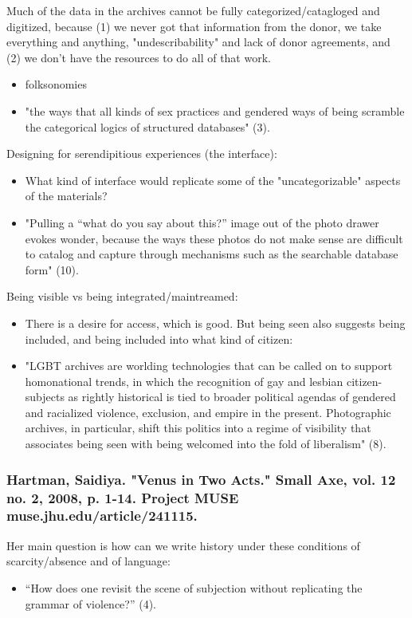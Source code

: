 \documentclass[11pt]{article}
\begin{document}
Much of the data in the archives cannot be fully
categorized/catagloged and digitized, because (1) we never got that
information from the donor, we take everything and anything,
"undescribability" and lack of donor agreements, and (2) we don't have
the resources to do all of that work.
\begin{itemize}
\item folksonomies
\item "the ways that all kinds of sex practices and gendered ways of being
scramble the categorical logics of structured databases" (3).
\end{itemize}

Designing for serendipitious experiences (the interface): 
\begin{itemize}
\item What kind of interface would replicate some of the "uncategorizable"
aspects of the materials?
\item "Pulling a “what do you say about this?” image out of the photo
drawer evokes wonder, because the ways these photos do not make
sense are difficult to catalog and capture through mechanisms such
as the searchable database form" (10).
\end{itemize}

Being visible vs being integrated/maintreamed:
\begin{itemize}
\item There is a desire for access, which is good. But being seen also
suggests being included, and being included into what kind of
citizen:
\item "LGBT archives are worlding technologies that can be called on to
support homonational trends, in which the recognition of gay and
lesbian citizen-subjects as rightly historical is tied to broader
political agendas of gendered and racialized violence, exclusion,
and empire in the present. Photographic archives, in particular,
shift this politics into a regime of visibility that associates
being seen with being welcomed into the fold of liberalism" (8).
\end{itemize}

\subsubsection{Hartman, Saidiya. "Venus in Two Acts." Small Axe, vol. 12 no. 2,   2008, p. 1-14. Project MUSE muse.jhu.edu/article/241115.}
\label{sec:org0cb7c01}

Her main question is how can we write history under these conditions
of scarcity/absence and of language: 
\begin{itemize}
\item “How does one revisit the scene of subjection without replicating
the grammar of violence?” (4).
\end{itemize}
\end{document}

